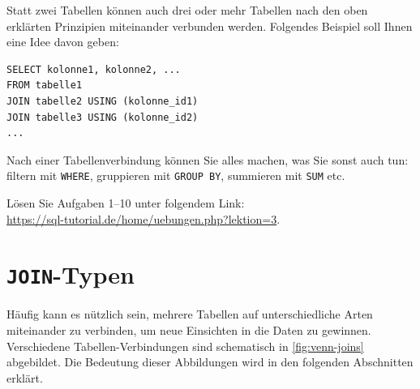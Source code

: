 \begin{myremark}
  Statt zwei Tabellen können auch drei oder mehr Tabellen nach den oben erklärten Prinzipien miteinander verbunden werden. Folgendes Beispiel soll Ihnen eine Idee davon geben:

  \begin{lstlisting}
SELECT kolonne1, kolonne2, ...
FROM tabelle1 
JOIN tabelle2 USING (kolonne_id1)
JOIN tabelle3 USING (kolonne_id2)
...
\end{lstlisting}
\end{myremark}

\begin{myremark}
  Nach einer Tabellenverbindung können Sie alles machen, was Sie sonst auch tun: filtern mit \lstinline|WHERE|, gruppieren mit \lstinline|GROUP BY|, summieren mit \lstinline|SUM| etc.
\end{myremark}


\begin{myexercise}
  Lösen Sie Aufgaben 1--10 unter folgendem Link:\\
  \url{https://sql-tutorial.de/home/uebungen.php?lektion=3}.
\end{myexercise}

\section{\texorpdfstring{\lstinline|JOIN|-Typen}{JOIN-Typen}}


Häufig kann es nützlich sein, mehrere Tabellen auf unterschiedliche Arten miteinander zu verbinden, um neue Einsichten in die Daten zu gewinnen. Verschiedene Tabellen-Verbindungen sind schematisch in \cref{fig:venn-joins} abgebildet. Die Bedeutung dieser Abbildungen wird in den folgenden Abschnitten erklärt.


